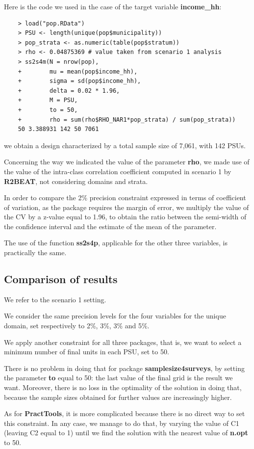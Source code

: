 Here is the code we used in the case of the target variable \textbf{income\_hh}:

\begin{verbatim}
	> load("pop.RData")
	> PSU <- length(unique(pop$municipality))
	> pop_strata <- as.numeric(table(pop$stratum))
	> rho <- 0.04875369 # value taken from scenario 1 analysis
	> ss2s4m(N = nrow(pop), 
	+        mu = mean(pop$income_hh), 
	+        sigma = sd(pop$income_hh),
	+        delta = 0.02 * 1.96, 
	+        M = PSU, 
	+        to = 50, 
	+        rho = sum(rho$RHO_NAR1*pop_strata) / sum(pop_strata))
	50 3.388931 142 50 7061
\end{verbatim}

we obtain a design characterized by a total sample size of 7,061, with 142 PSUs.

Concerning the way we indicated the value of the parameter \textbf{rho}, we made use of the value of the intra-class correlation coefficient computed in scenario 1 by \textbf{R2BEAT}, not considering domains and strata. 

In order to compare the 2\% precision constraint expressed in terms of coefficient of variation, as the package requires the margin of error, we multiply the value of the CV by a z-value equal to 1.96, to obtain the ratio between the semi-width of the confidence interval and the estimate of the mean of the parameter. 

The use of the function \textbf{ss2s4p}, applicable for the other three variables, is practically the same.

\subsection{Comparison of results}
We refer to the scenario 1 setting. 

We consider the same precision levels for the four variables for the unique domain, set respectively to 2\%, 3\%, 3\% and 5\%.

We apply another constraint for all three packages, that is, we want to select a minimum number of final units in each PSU, set to 50. 

There is no problem in doing that for package \textbf{samplesize4surveys}, by setting the parameter \textbf{to} equal to 50: the last value of the final grid is the result we want. Moreover, there is no loss in the optimality of the solution in doing that, because the sample sizes obtained for further values are increasingly higher.

As for \textbf{PractTools}, it is more complicated because there is no direct way to set this constraint. In any case, we manage to do that, by varying the value of C1 (leaving C2 equal to 1) until we find the solution with the nearest value of \textbf{n.opt} to 50.

